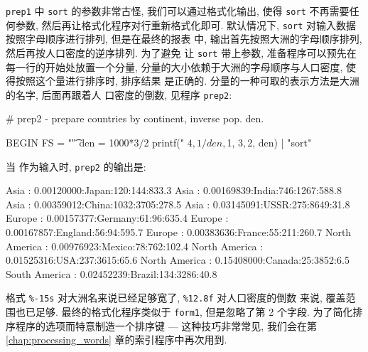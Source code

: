 \verb'prep1' 中 \verb'sort' 的参数非常古怪, 我们可以通过格式化输出, 使得
 \verb'sort' 不再需要任何参数, 然后再让格式化程序对行重新格式化即可.
默认情况下, \verb'sort' 对输入数据按照字母顺序进行排列, 但是在最终的报表
中, 输出首先按照大洲的字母顺序排列, 然后再按人口密度的逆序排列. 为了避免
让  \verb'sort' 带上参数, 准备程序可以预先在每一行的开始处放置一个分量,
分量的大小依赖于大洲的字母顺序与人口密度, 使得按照这个量进行排序时,
排序结果 是正确的. 分量的一种可取的表示方法是大洲的名字, 后面再跟着人
口密度的倒数, 见程序 \verb'prep2':
\begin{awkcode}
    # prep2 - prepare countries by continent, inverse pop. den.

    BEGIN { FS = "\t"}
          { den = 1000*$3/$2
            printf("%
                $4, 1/den, $1, $3, $2, den) | "sort"
          }
\end{awkcode}
当  作为输入时, \verb'prep2' 的输出是:
\begin{awkcode}
    Asia           :  0.00120000:Japan:120:144:833.3
    Asia           :  0.00169839:India:746:1267:588.8
    Asia           :  0.00359012:China:1032:3705:278.5
    Asia           :  0.03145091:USSR:275:8649:31.8
    Europe         :  0.00157377:Germany:61:96:635.4
    Europe         :  0.00167857:England:56:94:595.7
    Europe         :  0.00383636:France:55:211:260.7
    North America  :  0.00976923:Mexico:78:762:102.4
    North America  :  0.01525316:USA:237:3615:65.6
    North America  :  0.15408000:Canada:25:3852:6.5
    South America  :  0.02452239:Brazil:134:3286:40.8
\end{awkcode}
格式 \verb'%-15s' 对大洲名来说已经足够宽了, \verb'%12.8f' 对人口密度的倒数
来说, 覆盖范围也已足够. 最终的格式化程序类似于 \verb'form1', 但是忽略了第
2 个字段. 为了简化排序程序的选项而特意制造一个排序键 --- 这种技巧非常常见,
我们会在第 \ref{chap:processing_words} 章的索引程序中再次用到.

